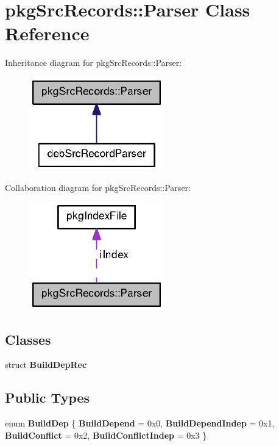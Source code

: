 \section{pkg\-Src\-Records\-:\-:\-Parser \-Class \-Reference}
\label{classpkgSrcRecords_1_1Parser}


\-Inheritance diagram for pkg\-Src\-Records\-:\-:\-Parser\-:
\nopagebreak
\begin{figure}[H]
\begin{center}
\leavevmode
\includegraphics[width=166pt]{classpkgSrcRecords_1_1Parser__inherit__graph}
\end{center}
\end{figure}


\-Collaboration diagram for pkg\-Src\-Records\-:\-:\-Parser\-:
\nopagebreak
\begin{figure}[H]
\begin{center}
\leavevmode
\includegraphics[width=166pt]{classpkgSrcRecords_1_1Parser__coll__graph}
\end{center}
\end{figure}
\subsection*{\-Classes}
\begin{DoxyCompactItemize}
\item 
struct {\bf \-Build\-Dep\-Rec}
\end{DoxyCompactItemize}
\subsection*{\-Public \-Types}
\begin{DoxyCompactItemize}
\item 
enum {\bfseries \-Build\-Dep} \{ {\bfseries \-Build\-Depend} = 0x0, 
{\bfseries \-Build\-Depend\-Indep} = 0x1, 
{\bfseries \-Build\-Conflict} = 0x2, 
{\bfseries \-Build\-Conflict\-Indep} = 0x3
 \}
\end{DoxyCompactItemize}
